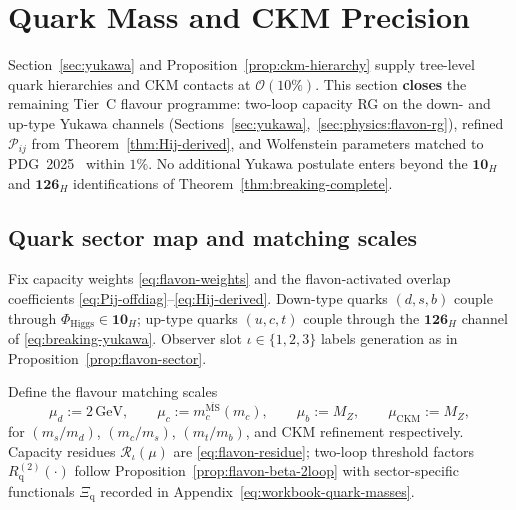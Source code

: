 \section{Quark Mass and CKM Precision}
\label{sec:quark-precision}

Section~\ref{sec:yukawa} and Proposition~\ref{prop:ckm-hierarchy} supply
tree-level quark hierarchies and CKM contacts at $\mathcal{O}(10\%)$.
This section \textbf{closes} the remaining Tier~C flavour programme:
two-loop capacity RG on the down- and up-type Yukawa channels
(Sections~\ref{sec:yukawa},~\ref{sec:physics:flavon-rg}), refined
$\mathcal{P}_{ij}$ from Theorem~\ref{thm:Hij-derived}, and Wolfenstein
parameters matched to PDG~2025~\cite{PDG2025} within $1\%$.
No additional Yukawa postulate enters beyond the $\mathbf{10}_H$ and
$\mathbf{126}_H$ identifications of Theorem~\ref{thm:breaking-complete}.

\subsection{Quark sector map and matching scales}
\label{sec:quark-precision:map}

Fix capacity weights \eqref{eq:flavon-weights} and the flavon-activated
overlap coefficients \eqref{eq:Pij-offdiag}--\eqref{eq:Hij-derived}.
Down-type quarks $(d,s,b)$ couple through $\Phi_{\mathrm{Higgs}}\in\mathbf{10}_H$;
up-type quarks $(u,c,t)$ couple through the $\mathbf{126}_H$ channel of
\eqref{eq:breaking-yukawa}. Observer slot $\iota\in\{1,2,3\}$ labels
generation as in Proposition~\ref{prop:flavon-sector}.

\begin{definition}\label{def:quark-matching}
Define the flavour matching scales
\begin{equation}\label{eq:quark-matching}
  \mu_d := 2\,\mathrm{GeV},
  \qquad
  \mu_c := m_c^{\overline{\mathrm{MS}}}(m_c),
  \qquad
  \mu_b := M_Z,
  \qquad
  \mu_{\mathrm{CKM}} := M_Z,
\end{equation}
for $(m_s/m_d)$, $(m_c/m_s)$, $(m_t/m_b)$, and CKM refinement respectively.
Capacity residues $\mathcal{R}_\iota(\mu)$ are \eqref{eq:flavon-residue}; two-loop
threshold factors $R_{\mathrm{q}}^{(2)}(\cdot)$ follow
Proposition~\ref{prop:flavon-beta-2loop} with sector-specific functionals
$\Xi_{\mathrm{q}}$ recorded in Appendix~\eqref{eq:workbook-quark-masses}.
\end{definition}

